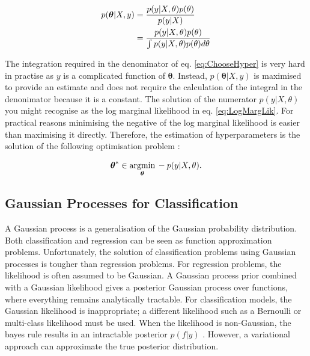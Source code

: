 \documentclass[12pt,a4paper]{report}
\theoremstyle{definition}
\begin{document}
\begin{equation}
	\label{eq:ChooseHyper}
	\begin{aligned}
		\centering
		p(\boldsymbol{\theta} | X, y) &= \frac{p(y | X, \theta) p(\theta)}{p(y | X)} \\
		&= \frac{p(y | X, \theta) p(\theta)}{\int p(y | X, \theta) p(\theta) d\theta} 
	\end{aligned}
\end{equation}

The integration required in the denominator of eq. \ref{eq:ChooseHyper} is very hard in practise as $y$ is a complicated function of $\boldsymbol{\theta}$. 
Instead, $p(\boldsymbol{\theta} | X, y)$ is maximised to provide an estimate and does not require the calculation of the integral in the denonimator because it is a constant.
The solution of the numerator $p(y | X, \theta)$ you might recognise as the log marginal likelihood in eq. \ref{eq:LogMargLik}. 
For practical reasons minimising the negative of the log marginal likelihood is easier than maximising it directly.
Therefore, the estimation of hyperparameters is the solution of the following optimisation problem \citep{Kaiser2018}:

\begin{equation}
	\centering
	\boldsymbol{\theta}^* \in \underset{\boldsymbol{\theta}}{\textrm{argmin}} \, -p(y | X, \theta).
\end{equation}

\subsection{Gaussian Processes for Classification}

A Gaussian process is a generalisation of the Gaussian probability distribution. 
Both classification and regression can be seen as function approximation problems. 
Unfortunately, the solution of classification problems using Gaussian processes is tougher than regression problems. 
For regression problems, the likelihood is often assumed to be Gaussian. 
A Gaussian process prior combined with a Gaussian likelihood gives a posterior Gaussian process over functions, where everything remains analytically tractable. 
For classification models, the Gaussian likelihood is inappropriate; a different likelihood such as a Bernoulli or multi-class likelihood must be used.
When the likelihood is non-Gaussian, the bayes rule results in an intractable posterior $p(f|y)$ \citep{Yi2020}.
However, a variational approach can approximate the true posterior distribution.
\end{document}
